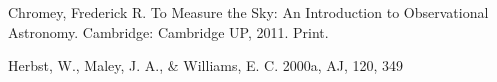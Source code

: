 \documentclass[twocolumn]{aastex6}
\newcommand\aastex{AAS\TeX}
\begin{document}



\vspace{5mm}

\begin{thebibliography}{}

Chromey, Frederick R. To Measure the Sky: An Introduction to Observational Astronomy. Cambridge: Cambridge UP, 2011. Print.

Herbst, W., Maley, J. A., \& Williams, E. C. 2000a, AJ, 120, 349

\clearpage

\end{thebibliography}








\end{document}
